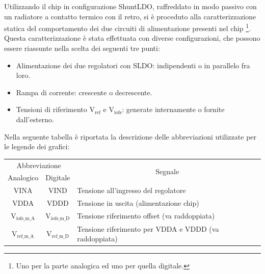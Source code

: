 Utilizzando il chip in configurazione ShuntLDO, raffreddato in modo passivo con un radiatore a contatto termico con il retro, si è proceduto alla caratterizzazione statica del comportamento dei due circuiti di alimentazione presenti nel chip
\footnote{
  Uno per la parte analogica ed uno per quella digitale.
}.
Questa caratterizzazione è stata effettuata con diverse configurazioni, che possono essere riassunte nella scelta dei seguenti tre punti:
\begin{itemize}
  \item Alimentazione dei due regolatori con SLDO: indipendenti o in parallelo fra loro.
  \item Rampa di corrente: crescente o decrescente.
  \item Tensioni di riferimento $\mathrm{V_{ref}}$ e $\mathrm{V_{iofs}}$: generate internamente o fornite dall'esterno.
\end{itemize}

Nella seguente tabella è riportata la descrizione delle abbreviazioni utilizzate per le legende dei grafici:

\begin{center}
\begin{tabularx}{\linewidth}{|cc|X|}
\hline
\multicolumn{2}{|c|}{Abbreviazione} & \multicolumn{1}{c|}{\multirow{2}{*}{Segnale}}\\ 
Analogico & Digitale & \\
\hline
VINA & VIND & Tensione all'ingresso del regolatore  \\ \hline
VDDA & VDDD & Tensione in uscita (alimentazione chip) \\ \hline
$\mathrm{V_{iofs \_ m \_ A}}$ & $\mathrm{V_{iofs \_ m \_ D}}$ & Tensione riferimento offset (va raddoppiata) \\ \hline   
$\mathrm{V_{ref \_ m \_ A}}$ & $\mathrm{V_{ref \_ m \_ D}}$ & Tensione riferimento per VDDA e VDDD (va raddoppiata)\\ \hline   
\end{tabularx}
\end{center}

